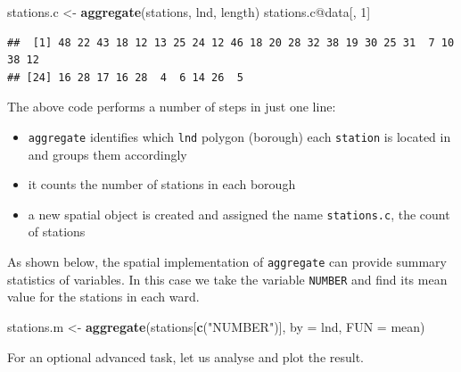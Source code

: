 \documentclass[]{article}
\newenvironment{Shaded}{}{}
\newcommand{\KeywordTok}[1]{\textcolor[rgb]{0.00,0.44,0.13}{\textbf{{#1}}}}
\newcommand{\DataTypeTok}[1]{\textcolor[rgb]{0.56,0.13,0.00}{{#1}}}
\newcommand{\DecValTok}[1]{\textcolor[rgb]{0.25,0.63,0.44}{{#1}}}
\newcommand{\StringTok}[1]{\textcolor[rgb]{0.25,0.44,0.63}{{#1}}}
\newcommand{\NormalTok}[1]{{#1}}
\begin{document}
\begin{Shaded}
\begin{Highlighting}[]
\NormalTok{stations.c <- }\KeywordTok{aggregate}\NormalTok{(stations, lnd, length)}
\NormalTok{stations.c@data[, }\DecValTok{1}\NormalTok{]}
\end{Highlighting}
\end{Shaded}
\begin{verbatim}
##  [1] 48 22 43 18 12 13 25 24 12 46 18 20 28 32 38 19 30 25 31  7 10 38 12
## [24] 16 28 17 16 28  4  6 14 26  5
\end{verbatim}
The above code performs a number of steps in just one line:

\begin{itemize}
\item
  \texttt{aggregate} identifies which \texttt{lnd} polygon (borough)
  each \texttt{station} is located in and groups them accordingly
\item
  it counts the number of stations in each borough
\item
  a new spatial object is created and assigned the name
  \texttt{stations.c}, the count of stations
\end{itemize}
As shown below, the spatial implementation of \texttt{aggregate} can
provide summary statistics of variables. In this case we take the
variable \texttt{NUMBER} and find its mean value for the stations in
each ward.

\begin{Shaded}
\begin{Highlighting}[]
\NormalTok{stations.m <- }\KeywordTok{aggregate}\NormalTok{(stations[}\KeywordTok{c}\NormalTok{(}\StringTok{"NUMBER"}\NormalTok{)], }\DataTypeTok{by =} \NormalTok{lnd, }\DataTypeTok{FUN =} \NormalTok{mean)}
\end{Highlighting}
\end{Shaded}
For an optional advanced task, let us analyse and plot the result.
\end{document}
